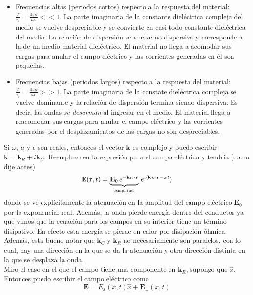 \begin{itemize}
    \item Frecuencias altas (periodos cortos) respecto a la respuesta del material: $\frac{T}{\tau_{i}} = \frac{4\pi\sigma }{\omega \epsilon} << 1$. La parte imaginaria de la constante dieléctrica compleja del medio se vuelve despreciable y se convierte en casi todo constante dieléctrica del medio. La relación de dispersión se vuelve no dispersiva y corresponde a la de un medio material dieléctrico. El material no llega a acomodar sus cargas para anular el campo eléctrico y las corrientes generadas en él son pequeñas.
    \item Frecuencias bajas (periodos largos) respecto a la respuesta del material: $\frac{T}{\tau_{i}} = \frac{4\pi\sigma }{\omega \epsilon} >> 1$. La parte imaginaria de la constate dieléctrica compleja se vuelve dominante y la relación de dispersión termina siendo dispersiva. Es decir, las ondas \textit{se desarman} al ingresar en el medio. El material llega a reacomodar sus cargas para anular el campo eléctrico y las corrientes generadas por el desplazamientos de las cargas no son despreciables.
\end{itemize}
Si $\omega$, $\mu$ y $\epsilon$ son reales, entonces el vector $\textbf{k}$ es complejo y puedo escribir $\textbf{k} = \textbf{k}_{R} + i\textbf{k}_{C}$. Reemplazo en la expresión para el campo eléctrico y tendría (como dije antes)
\begin{equation*}
    \textbf{E}(\textbf{r},t) 
    = 
    \underbrace{%
        \textbf{E}_{0}\,e^{-\textbf{k}_{C}\cdot \textbf{r}}
    }_{\mbox{\tiny{Amplitud}}}
    \,e^{i(\textbf{k}_{R}\cdot\textbf{r} - \omega t})
\end{equation*}
donde se ve explícitamente la atenuación en la amplitud del campo eléctrico $\textbf{E}_{0}$ por la exponencial real. Además, la onda pierde energía dentro del conductor ya que vimos que la ecuación para los campos en su interior tiene un término disipativo. En efecto esta energía se pierde en calor por disipación óhmica. Además, está bueno notar que $\textbf{k}_{C}$ y $\textbf{k}_{R}$ no necesariamente son paralelos, con lo cual, hay una dirección en la que se da la atenuación y otra dirección distinta en la que se desplaza la onda.\\
\indent Miro el caso en el que el campo tiene una componente en $\textbf{k}_{R}$, supongo que $\hat{x}$. Entonces puedo escribir el campo eléctrico como
\begin{equation*}
    \textbf{E} = E_{x}(x,t)\hat{x} + \textbf{E}_{\perp}(x,t)
\end{equation*}
